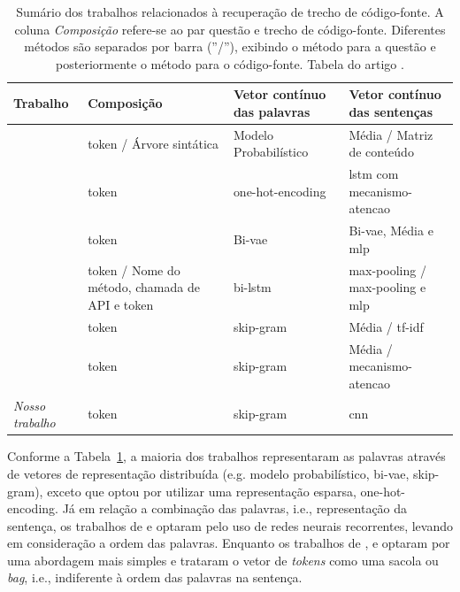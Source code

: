 \begin{table}[H]
\centering

\begin{tabular}{ l p{3cm} p{3cm} p{3cm} }
 \hline
 \textbf{Trabalho} & \textbf{Composição} & \textbf{Vetor contínuo das palavras} & \textbf{Vetor contínuo das sentenças} \\
 \hline
\citep{Allamanis-bimodal-source-code-natural-language:2015} & \Gls{token} / Árvore sintática & Modelo Probabilístico & Média / Matriz de conteúdo  \\

\citep{iyer-etal-2016-summarizing} & \Gls{token} & \Gls{one-hot-encoding} & \acrshort{lstm} com \gls{mecanismo-atencao}  \\

\citep{Chen-bi-variational-autoencoder:2018} & \Gls{token} & Bi-\acrshort{vae} & Bi-\acrshort{vae}, Média e \acrshort{mlp}  \\

\citep{Gu-deep-code-search:2018} & \Gls{token} / Nome do método, chamada de API e \Gls{token} & bi-\acrshort{lstm} & \Gls{max-pooling} / \Gls{max-pooling} e \acrshort{mlp}   \\

\citep{Sachdev-neural-code-search:2018} & \Gls{token} & \Gls{skip-gram} & Média / \acrshort{tf-idf}   \\

\citep{cambronero-deep-learning-code-search:2019} & \Gls{token} & \Gls{skip-gram} & Média / \Gls{mecanismo-atencao}   \\

\textit{Nosso trabalho} & \Gls{token} & \Gls{skip-gram} & \acrshort{cnn}   \\

 \hline
\end{tabular}
\caption{Sumário dos trabalhos relacionados à recuperação de trecho de código-fonte. A coluna \emph{Composição} refere-se ao par questão e trecho de código-fonte. Diferentes métodos são separados por barra (''/''), exibindo o método para a questão e posteriormente o método para o código-fonte. Tabela do artigo \cite{martins2020concra}.}
\label{table:summary-joint-embedding}
\end{table}

Conforme a Tabela~\ref{table:summary-joint-embedding}, a maioria dos trabalhos representaram as palavras através de vetores de representação distribuída (e.g. modelo probabilístico, bi-\acrshort{vae}, \gls{skip-gram}), exceto \cite{iyer-etal-2016-summarizing} que optou por utilizar uma representação esparsa, \gls{one-hot-encoding}. Já em relação a combinação das palavras, i.e., representação da sentença, os trabalhos de \cite{Gu-deep-code-search:2018} e \cite{iyer-etal-2016-summarizing} optaram pelo uso de redes neurais recorrentes, levando em consideração a ordem das palavras. Enquanto os trabalhos de \cite{Chen-bi-variational-autoencoder:2018}, \cite{Sachdev-neural-code-search:2018} e \cite{cambronero-deep-learning-code-search:2019} optaram por uma abordagem mais simples e trataram o vetor de \textit{tokens} como uma sacola ou \textit{bag}, i.e., indiferente à ordem das palavras na sentença.

